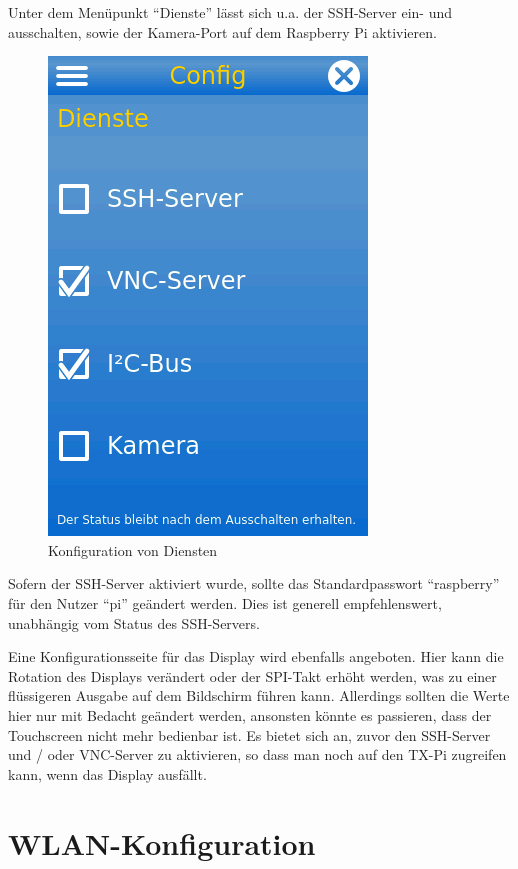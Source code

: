 \documentclass[
  paper=A4,
  ngerman,
  fontsize=12pt,
  parskip=half-,
]{scrbook}
\begin{document}
Unter dem Menüpunkt "`Dienste"' lässt sich u.a. der SSH-Server ein- und ausschalten,
sowie der Kamera-Port auf dem Raspberry Pi aktivieren. 

\begin{figure}[ht]
\centering
\includegraphics[scale=0.4]{images/config-services.png}
\caption{Konfiguration von Diensten}
\end{figure}

Sofern der SSH-Server aktiviert wurde, sollte das Standardpasswort "`raspberry"'
für den Nutzer "`pi"' geändert werden. Dies ist generell empfehlenswert, unabhängig vom
Status des SSH-Servers.

Eine Konfigurationsseite für das Display wird ebenfalls angeboten. Hier kann die 
Rotation des Displays verändert oder der SPI-Takt erhöht werden, was zu einer
flüssigeren Ausgabe auf dem Bildschirm führen kann. Allerdings sollten die 
Werte hier nur mit Bedacht geändert werden, ansonsten könnte es passieren, dass 
der Touchscreen nicht mehr bedienbar ist. Es bietet sich an, zuvor den SSH-Server und /
oder VNC-Server zu aktivieren, so dass man noch auf den TX-Pi zugreifen kann, wenn das
Display ausfällt.


\section{WLAN-Konfiguration}
\label{sec:wlan}
\end{document}
